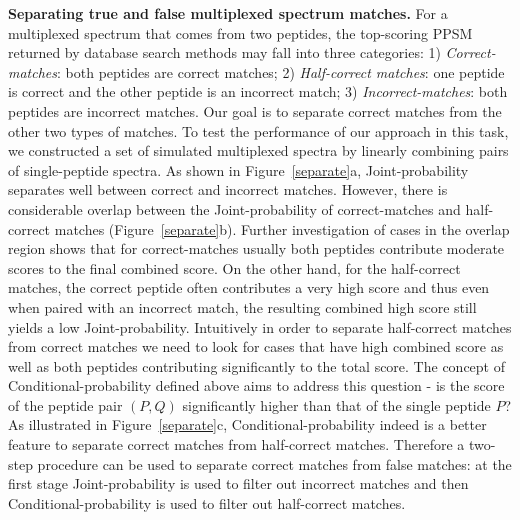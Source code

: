 \documentclass[arial,11pt]{article}
\begin{document}
{\bf Separating true and false multiplexed spectrum matches.} For a multiplexed spectrum that comes from two peptides, the top-scoring PPSM returned by database search methods may fall into three categories: 1) \emph{Correct-matches}: both peptides are correct matches; 2) \emph{Half-correct matches}: one peptide is correct and the other peptide is an incorrect match; 3) \emph{Incorrect-matches}: both peptides are incorrect matches.
Our goal is to separate correct matches from the other two types of matches.  To test the performance of our approach in this task, we constructed a set of simulated multiplexed spectra by linearly combining pairs of single-peptide spectra.  %
As shown in Figure~\ref{separate}a, Joint-probability separates well between correct and incorrect matches.  However, there is considerable overlap between the Joint-probability of correct-matches and half-correct matches (Figure~\ref{separate}b).  Further investigation of cases in the overlap region shows that for correct-matches usually both peptides contribute moderate scores to the final combined score.  On the other hand,  for the half-correct matches, the correct peptide often contributes a very high score and thus even when paired with an incorrect match, the resulting combined high score still yields a low Joint-probability. Intuitively in order to separate half-correct matches from correct matches we need to look for cases that have high combined score as well as both peptides contributing significantly to the total score.  The concept of Conditional-probability defined above aims to address  this question - is the score of the peptide pair $(P,Q)$ significantly higher than that of the single peptide $P$? As illustrated in Figure~\ref{separate}c, Conditional-probability indeed is a better feature to separate correct matches from half-correct matches. Therefore a two-step procedure can be used to separate correct matches from false matches: at the first stage Joint-probability is used to filter out incorrect matches and then Conditional-probability is used to filter out half-correct matches.
\end{document}
